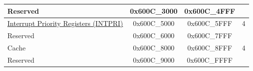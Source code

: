 \begin{ThreePartTable}
\begin{longtable}[c]{ |p{7cm}|c|c|r| }
        \rowcolor{gray!25}  Reserved                    & 0x600C\_3000 & 0x600C\_4FFF &         \\\hline
    \hyperref[mod:riscvcpu]{Interrupt Priority Registers (INTPRI)}                & 0x600C\_5000 & 0x600C\_5FFF &   4     \\\hline
        \rowcolor{gray!25}  Reserved                    & 0x600C\_6000 & 0x600C\_7FFF &         \\\hline
    Cache                & 0x600C\_8000 & 0x600C\_8FFF &   4     \\\hline
        \rowcolor{gray!25}  Reserved                    & 0x600C\_9000 & 0x600C\_FFFF &         \\\hline
        
    \end{longtable}
    \end{ThreePartTable}
    